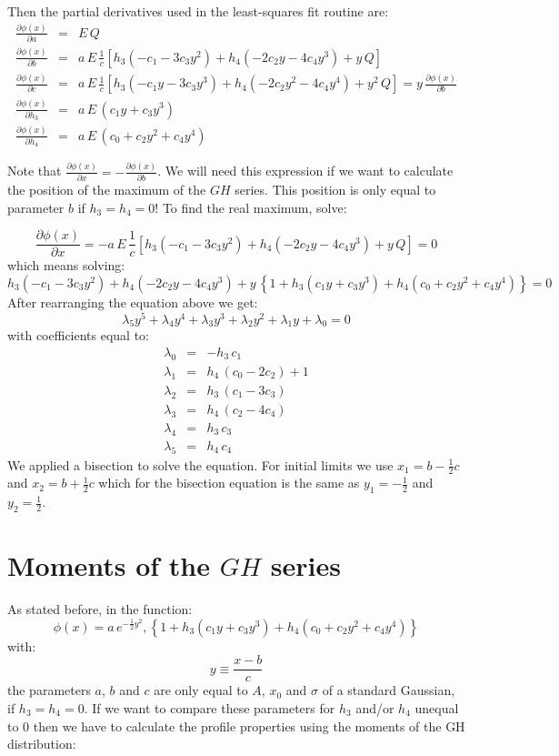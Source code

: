 \documentclass[10pt,a4paper]{report}
\begin{document}
\begin{flushleft}
Then the partial derivatives used in the least-squares fit routine are:
\begin{eqnarray}
\frac{\partial\phi(x)}{\partial a} &=& E\,Q\\
\frac{\partial\phi(x)}{\partial b} &=& a\,E\,\frac{1}{c}
\left[
h_3(-c_1-3c_3y^2)+h_4(-2c_2y-4c_4y^3)+y\,Q
\right]\\
\frac{\partial\phi(x)}{\partial c} &=& a\,E\,\frac{1}{c}
\left[
h_3(-c_1y-3c_3y^3)+h_4(-2c_2y^2-4c_4y^4)+y^2\,Q 
\right] = 
y\,\frac{\partial\phi(x)}{\partial b}\\
\frac{\partial\phi(x)}{\partial h_3} &=& a\,E\,(c_1y+c_3y^3)\\
\frac{\partial\phi(x)}{\partial h_4} &=& a\,E\,(c_0+c_2y^2+c_4y^4)
\end{eqnarray}


Note that $\frac{\partial\phi(x)}{\partial x} = -\frac{\partial\phi(x)}{\partial b}$.
We will need this expression if we want to calculate the position of
the maximum of the $GH$ series. This position is only equal to parameter $b$
if $h_3=h_4=0$!
To find the real maximum, solve:

$$
\frac{\partial\phi(x)}{\partial x} = -a\,E\,\frac{1}{c}
\left[
h_3(-c_1-3c_3y^2)+h_4(-2c_2y-4c_4y^3)+y\,Q
\right] = 0
$$
which means solving:
$$
h_3(-c_1-3c_3y^2)+h_4(-2c_2y-4c_4y^3)+y\,
\left\{1+h_3(c_1y+c_3y^3)+h_4(c_0+c_2y^2+c_4y^4)\right\} = 0
$$
After rearranging the equation above we get:
\begin{equation}
\lambda_5y^5+\lambda_4y^4+\lambda_3y^3+\lambda_2y^2+\lambda_1y+\lambda_0=0
\end{equation}
with coefficients equal to:
\begin{eqnarray*}
\lambda_0 &=&-h_3\,c_1\\
\lambda_1 &=& h_4\,(c_0-2c_2)+1\\
\lambda_2 &=& h_3\,(c_1-3c_3)\\
\lambda_3 &=& h_4\,(c_2-4c_4)\\
\lambda_4 &=& h_3\,c_3\\
\lambda_5 &=& h_4\,c_4
\end{eqnarray*}
We applied a bisection to solve the equation. For initial limits we use
$x_1 = b-\frac{1}{2}c$ and $x_2 = b+\frac{1}{2}c$ which for the 
bisection equation is the same as 
$y_1 = -\frac{1}{2}$ and $y_2 = \frac{1}{2}$.


\section{Moments of the $GH$ series}
As stated before, in the function:
$$\phi(x) = a\,e^{-\frac{1}{2}y^2},\left\{1+h_3(c_1y+c_3y^3)+h_4(c_0+c_2y^2+c_4y^4)\right\}$$
with:
$$y \equiv \frac{x-b}{c}$$
the parameters $a$, $b$ and $c$  are only equal to $A$, $x_0$ and $\sigma$ of
a standard Gaussian, if $h_3=h_4=0$. If we want to compare these parameters 
for $h_3$ and/or $h_4$ unequal to $0$ then we have to calculate the  profile properties using the moments of the
GH distribution:


\end{flushleft}
\end{document}
